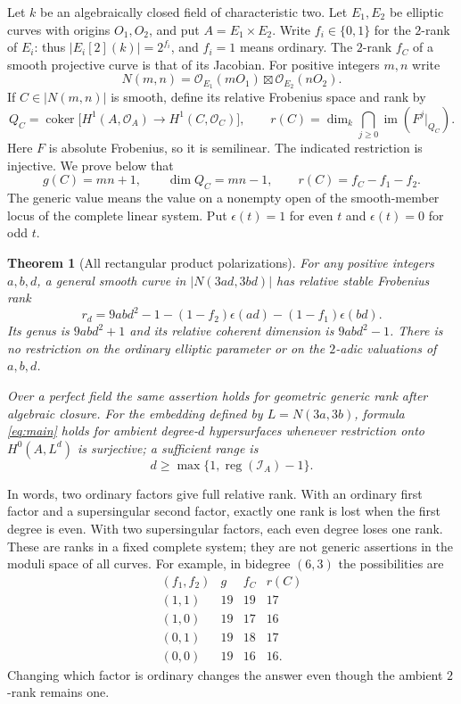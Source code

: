 \documentclass[11pt]{article}
\newtheorem{theorem}{Theorem}[section]
\theoremstyle{definition}\newtheorem{definition}[theorem]{Definition}
\theoremstyle{remark}\newtheorem{remark}[theorem]{Remark}
\newcommand{\OO}{\mathcal O}
\begin{document}
Let $k$ be an algebraically closed field of characteristic two. Let $E_1,E_2$ be elliptic curves with origins $O_1,O_2$, and put $A=E_1\times E_2$. Write $f_i\in\{0,1\}$ for the $2$-rank of $E_i$: thus $|E_i[2](k)|=2^{f_i}$, and $f_i=1$ means ordinary. The $2$-rank $f_C$ of a smooth projective curve is that of its Jacobian. For positive integers $m,n$ write
\[
 N(m,n)=\OO_{E_1}(mO_1)\boxtimes\OO_{E_2}(nO_2).
\]
If $C\in|N(m,n)|$ is smooth, define its relative Frobenius space and rank by
\[
 Q_C=\operatorname{coker}\bigl[H^1(A,\OO_A)\longrightarrow H^1(C,\OO_C)\bigr],
 \qquad r(C)=\dim_k\bigcap_{j\ge0}\operatorname{im}(F^j|_{Q_C}).
\]
Here $F$ is absolute Frobenius, so it is semilinear. The indicated restriction is injective. We prove below that
\begin{equation}\label{eq:dim}
 g(C)=mn+1,\qquad \dim Q_C=mn-1,\qquad r(C)=f_C-f_1-f_2.
\end{equation}
The generic value means the value on a nonempty open of the smooth-member locus of the complete linear system. Put $\epsilon(t)=1$ for even $t$ and $\epsilon(t)=0$ for odd $t$.

\begin{theorem}[All rectangular product polarizations]\label{thm:main}
For any positive integers $a,b,d$, a general smooth curve in $|N(3ad,3bd)|$ has relative stable Frobenius rank
\begin{equation}\label{eq:main}
 r_d=9abd^2-1-(1-f_2)\epsilon(ad)-(1-f_1)\epsilon(bd).
\end{equation}
Its genus is $9abd^2+1$ and its relative coherent dimension is $9abd^2-1$. There is no restriction on the ordinary elliptic parameter or on the $2$-adic valuations of $a,b,d$.

Over a perfect field the same assertion holds for geometric generic rank after algebraic closure. For the embedding defined by $L=N(3a,3b)$, formula \eqref{eq:main} holds for ambient degree-$d$ hypersurfaces whenever restriction onto $H^0(A,L^d)$ is surjective; a sufficient range is
\[
 d\ge\max\{1,\operatorname{reg}(\mathcal I_A)-1\}.
\]
\end{theorem}

In words, two ordinary factors give full relative rank. With an ordinary first factor and a supersingular second factor, exactly one rank is lost when the first degree is even. With two supersingular factors, each even degree loses one rank. These are ranks in a fixed complete system; they are not generic assertions in the moduli space of all curves. For example, in bidegree $(6,3)$ the possibilities are
\[
\begin{array}{c|c|c|c}
(f_1,f_2)&g&f_C&r(C)\\\hline
(1,1)&19&19&17\\
(1,0)&19&17&16\\
(0,1)&19&18&17\\
(0,0)&19&16&16.
\end{array}
\]
Changing which factor is ordinary changes the answer even though the ambient $2$-rank remains one.
\end{document}
